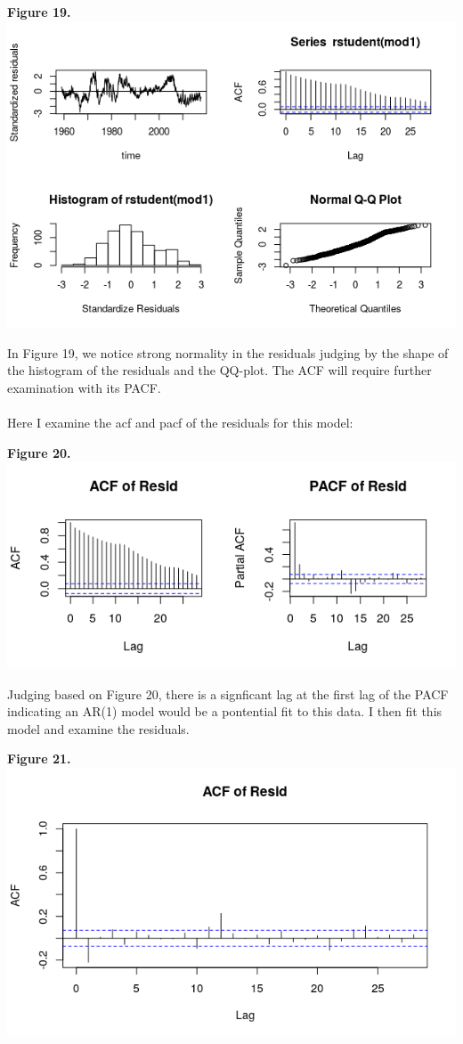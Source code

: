 \documentclass[11pt]{article}
\begin{document}
\begin{center}
\textbf{Figure 19.}
\\
\includegraphics[scale=1]{diag}
\end{center}
In Figure 19, we notice strong normality in the residuals judging by the shape of the histogram of the residuals and the QQ-plot. The ACF will require further examination with its PACF.
\\\\
Here I examine the acf and pacf of the residuals for this model:
\begin{center}
\textbf{Figure 20.}
\\
\includegraphics[scale=1]{aP}
\end{center}
Judging based on Figure 20, there is a signficant lag at the first lag of the PACF indicating an AR(1) model would be a pontential fit to this data. I then fit this model and examine the residuals.
\begin{center}
\textbf{Figure 21.}
\\
\includegraphics[scale=1]{ar1}
\end{center}
\end{document}
